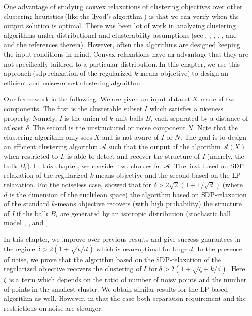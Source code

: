 \documentclass[12pt]{article}
\newcommand{\mc}{\mathcal}
\begin{document}
One advantage of studying convex relaxations of clustering objectives over other clustering heuristics (like the llyod's algorithm \cite{lloyd1982least}) is that we can verify when the output solution is optimal. There was been lot of work in analyzing clustering algorithms under distributional and clusterability assumptions (see \cite{balcan2012clustering}, \cite{awasthi2012center}, \cite{kalai2010efficiently}, , \cite{achlioptas2005spectral}, \cite{sanjeev2001learning} and \cite{hsu2013learning} and the references therein). However, often the algorithms are designed keeping the input conditions in mind. Convex relaxations have an advantage that they are not specifically tailored to a particular distribution. In this chapter, we use this approach (sdp relaxation of the regularized $k$-means objective) to design an efficient and noise-robust clustering algorithm.

Our framework is the following. We are given an input dataset $X$ made of two components. The first is the clusterable subset $I$ which satisfies a niceness property. Namely, $I$ is the union of $k$ unit balls $B_i$ each separated by a distance of atleast $\delta$. The second is the unstructured or noise component $N$. Note that the clustering algorithm only sees $X$ and is not aware of $I$ or $N$. The goal is to design an efficient clustering algorithm $\mc A$ such that the output of the algorithm $\mc A(X)$ when restricted to $I$, is able to detect and recover the structure of $I$ (namely, the balls $B_i$). In this chapter, we consider two choices for $\mc A$. The first based on SDP relaxation of the regularized $k$-means objective and the second based on the LP relaxation. For the noiseless case, \cite{awasthi2015relax} showed that for $\delta > 2\sqrt{2}(1+1/\sqrt d)$ (where $d$ is the dimension of the euclidean space) the algorithm based on SDP-relaxation of the standard $k$-means objective recovers (with high probability) the structure of $I$ if the balls $B_i$ are generated by an isotropic distribution (stochastic ball model \cite{iguchi2015tightness}, \cite{iguchi2017probably}, \cite{awasthi2015relax} and \cite{nellore2015recovery}).

In this chapter, we improve over previous results and give success guarantees in the regime $\delta > 2(1+\sqrt{k/d})$ which is near-optimal for large $d$. In the presence of noise, we prove that the algorithm based on the SDP-relaxation of the regularized objective recovers the clustering of $I$ for $\delta > 2(1+\sqrt{\zeta + k/d})$. Here $\zeta$ is a term which depends on the ratio of number of noisy points and the number of points in the smallest cluster. We obtain similar results for the LP based algorithm as well. However, in that the case both separation requirement and the restrictions on noise are stronger.  
\end{document}
